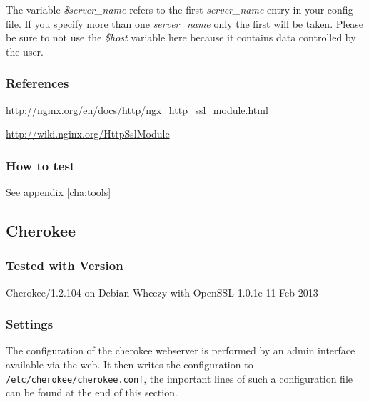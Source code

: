 The variable \emph{\$server\_name} refers to the first \emph{server\_name} entry in your config file. If you specify more than one \emph{server\_name} only the first will be taken. Please be sure to not use the \emph{\$host} variable here because it contains data controlled by the user.

\subsubsection{References}
\begin{itemize*}
  \item \url{http://nginx.org/en/docs/http/ngx_http_ssl_module.html}
  \item \url{http://wiki.nginx.org/HttpSslModule}
\end{itemize*}

\subsubsection{How to test}
See appendix \ref{cha:tools}


\subsection{Cherokee}

\subsubsection{Tested with Version}
\begin{itemize*}
    \item Cherokee/1.2.104 on Debian Wheezy with OpenSSL 1.0.1e 11 Feb 2013
\end{itemize*}

\subsubsection{Settings}

The configuration of the cherokee webserver is performed by an admin interface available via the web. It then writes the configuration to \texttt{/etc/cherokee/cherokee.conf}, the important lines of such a configuration file can be found at the end of this section.

